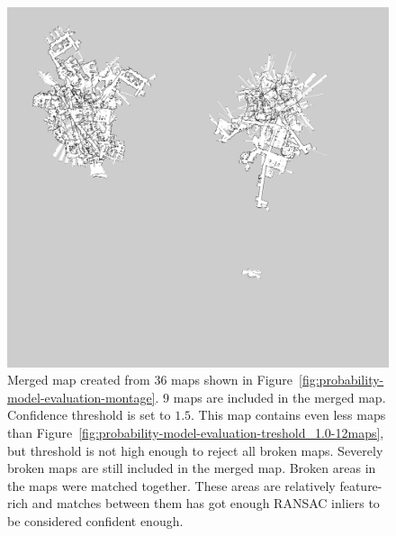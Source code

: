 \begin{figure}
    \centering
    \includegraphics[width=\textwidth]{../img/probability-model-evaluation-treshold_1_5-9maps.png}
    \caption[The merged map created with confidence threshold $1.5$.]{Merged map created from $36$ maps shown in Figure~\ref{fig:probability-model-evaluation-montage}. $9$ maps are included in the merged map. Confidence threshold is set to $1.5$. This map contains even less maps than Figure~\ref{fig:probability-model-evaluation-treshold_1.0-12maps}, but threshold is not high enough to reject all broken maps. Severely broken maps are still included in the merged map. Broken areas in the maps were matched together. These areas are relatively feature-rich and matches between them has got enough \gls{RANSAC} inliers  to be considered confident enough.}
    \label{fig:probability-model-evaluation-treshold_1.5-9maps}
\end{figure}
